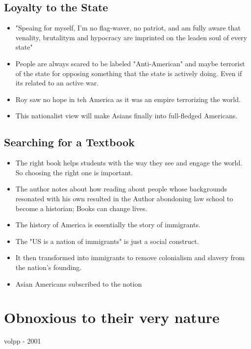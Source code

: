 \documentclass{article}
\begin{document}
\subsection{Loyalty to the State}
\begin{itemize}
  \item "Speaing for myself, I'm no flag-waver, no patriot, and am fully 
    aware that venality, brutalitym and hypocracy are imprinted on the leaden soul of every state"
  \item People are always scared to be labeled "Anti-American" and maybe terrorist of the
    state for opposing something that the state is actively doing.
    Even if its related to an active war.
  \item Roy saw no hope in teh America as it was an empire terrorizing the world.
  \item This nationalist view will make Asians finally into 
    full-fledged Americans.
\end{itemize}

\subsection{Searching for a Textbook}
\begin{itemize}
  \item The right book helps students with the way they see and engage the world.
    So choosing the right one is important.
  \item The author notes about how reading about people whose
    backgrounds resonated with his own resulted in the Author
    abondoning law school to become a historian; Books can change lives.
  \item The history of America is essentially the story of immigrants.
  \item The "US is a nation of immigrants" is just a social construct.
  \item It then transformed into immigrants to remove colonialism and slavery from the
    nation's founding.
  \item Asian Americans subscribed to the notion 
\end{itemize}


\section{Obnoxious to their very nature}
volpp - 2001
\end{document}
